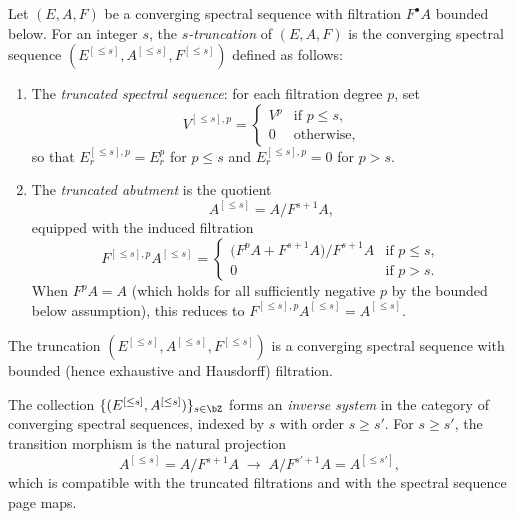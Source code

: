 \begin{definition}\label{prereq:def:truncated-ss}
    \leanok
    Let $(E, A, F)$ be a converging spectral sequence with filtration $F^\bullet A$ bounded below. For an integer $s$, the \emph{$s$-truncation} of $(E, A, F)$ is the converging spectral sequence $(E^{[\le s]}, A^{[\le s]}, F^{[\le s]})$ defined as follows:
    \begin{enumerate}
        \item The \emph{truncated spectral sequence}: for each filtration degree $p$, set
        $$V^{[\le s],p} = \begin{cases} V^p & \text{if } p \le s, \\ 0 & \text{otherwise,} \end{cases}$$
        so that $E_r^{[\le s],p} = E_r^p$ for $p \le s$ and $E_r^{[\le s],p} = 0$ for $p > s$.
        \item The \emph{truncated abutment} is the quotient
        $$A^{[\le s]} = A \big/ F^{s+1} A,$$
        equipped with the induced filtration
        $$F^{[\le s],p} A^{[\le s]} = \begin{cases} \big(F^p A + F^{s+1} A\big) \big/ F^{s+1} A & \text{if } p \le s, \\ 0 & \text{if } p > s. \end{cases}$$
        When $F^p A = A$ (which holds for all sufficiently negative $p$ by the bounded below assumption), this reduces to $F^{[\le s],p} A^{[\le s]} = A^{[\le s]}$.
    \end{enumerate}
    The truncation $(E^{[\le s]}, A^{[\le s]}, F^{[\le s]})$ is a converging spectral sequence with bounded (hence exhaustive and Hausdorff) filtration.
\end{definition}

\begin{proposition}\label{prereq:prop:truncations-inverse-system}
    \leanok
    The collection $\{(E^{[\le s]}, A^{[\le s]})\}_{s \in \bZ}$ forms an \emph{inverse system} in the category of converging spectral sequences, indexed by $s$ with order $s \ge s'$. For $s \ge s'$, the transition morphism is the natural projection
    $$A^{[\le s]} = A \big/ F^{s+1} A \;\longrightarrow\; A \big/ F^{s'+1} A = A^{[\le s']},$$
    which is compatible with the truncated filtrations and with the spectral sequence page maps.
\end{proposition}

